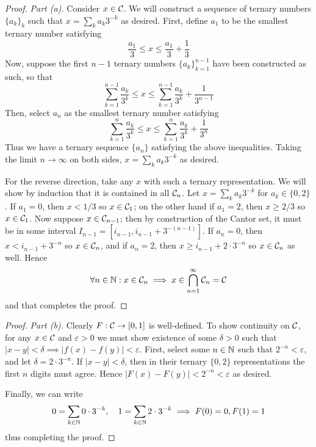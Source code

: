 \begin{proof}
    \textit{Part (a).} Consider \(x \in \mathcal{C}\). We will construct a sequence of ternary numbers \(\{a_k\}_k\) such that \(x = \sum_k a_k 3^{-k}\) as desired. First, define \(a_1\) to be the smallest ternary number satisfying 
    \[
        \frac{a_1}{3} \leq x \leq \frac{a_1}{3} + \frac{1}{3}
    \]
    Now, suppose the first \(n-1\) ternary numbers \(\{a_k\}_{k=1}^{n-1}\) have been constructed as such, so that 
    \[
    \sum_{k=1}^{n-1} \frac{a_k}{3^k} \leq x \leq \sum_{k=1}^{n-1} \frac{a_k}{3^k} + \frac{1}{3^{n-1}}
    \]
    Then, select \(a_n\) as the smallest ternary number satisfying 
    \[
    \sum_{k=1}^{n} \frac{a_k}{3^k} \leq x \leq \sum_{k=1}^n \frac{a_k}{3^k} + \frac{1}{3^n}
    \]
    Thus we have a ternary sequence \(\{a_n\}\) satisfying the above inequalities. Taking the limit \(n \to \infty\) on both sides, \(x = \sum_k a_k 3^{-k}\) as desired. 
    \stdvspace

    For the reverse direction, take any \(x\) with such a ternary representation. We will show by induction that it is contained in all \(\mathcal{C}_n\). Let \(x = \sum_k a_k 3^{-k}\) for \(a_k\in \{0, 2\}\). If \(a_1 = 0\), then \(x < 1/3\) so \(x \in \mathcal{C}_1\); on the other hand if \(a_1 = 2\), then \(x \geq 2/3\) so \(x \in \mathcal{C}_1\). Now suppose \(x \in \mathcal{C}_{n-1}\); then by construction of the Cantor set, it must be in some interval \(I_{n-1} = [i_{n-1}, i_{n-1} + 3^{-(n-1)}]\). If \(a_n = 0\), then \(x < i_{n-1} + 3^{-n}\) so \(x \in \mathcal{C}_n\), and if \(a_n = 2\), then \(x \geq i_{n-1} + 2 \cdot 3^{-n}\) so \(x \in \mathcal{C}_n\) as well. Hence
    \[
    \forall n \in \mathbb{N} : x \in \mathcal{C}_n \implies x \in \bigcap_{n=1}^\infty \mathcal{C}_n = \mathcal{C}
    \]
    and that completes the proof. 
\end{proof}

\begin{proof}
    \textit{Part (b).} Clearly \(F : \mathcal{C} \to [0, 1]\) is well-defined. To show continuity on \(\mathcal{C}\), for any \(x \in \mathcal{C}\) and \(\varepsilon > 0\) we must show existence of some \(\delta > 0\) such that \(|x - y| < \delta \implies |f(x) - f(y)| < \varepsilon\). First, select some \(n \in \mathbb{N}\) such that \(2^{-n} < \varepsilon\), and let \(\delta = 2 \cdot 3^{-n}\). If \(|x - y| < \delta\), then in their ternary \(\{0, 2\}\) representations the first \(n\) digits must agree. Hence \(|F(x) - F(y)| < 2^{-n} < \varepsilon\) as desired. 
    \stdvspace

    Finally, we can write 
    \[
    0 = \sum_{k \in \mathbb{N}} 0 \cdot 3^{-k}, \quad 1 = \sum_{k \in \mathbb{N}} 2 \cdot 3^{-k}
    \implies F(0) = 0, F(1) = 1
    \]
    thus completing the proof. 
\end{proof}

